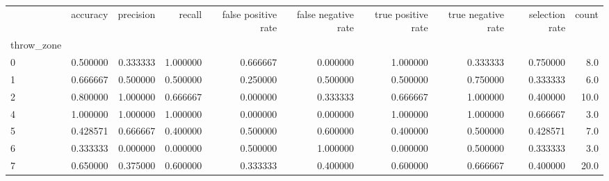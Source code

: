 \begin{tabular}{lrrrrrrrrr}
\toprule
{} &  accuracy &  precision &    recall &  false positive rate &  false negative rate &  true positive rate &  true negative rate &  selection rate &  count \\
throw\_zone &           &            &           &                      &                      &                     &                     &                 &        \\
\midrule
0          &  0.500000 &   0.333333 &  1.000000 &             0.666667 &             0.000000 &            1.000000 &            0.333333 &        0.750000 &    8.0 \\
1          &  0.666667 &   0.500000 &  0.500000 &             0.250000 &             0.500000 &            0.500000 &            0.750000 &        0.333333 &    6.0 \\
2          &  0.800000 &   1.000000 &  0.666667 &             0.000000 &             0.333333 &            0.666667 &            1.000000 &        0.400000 &   10.0 \\
4          &  1.000000 &   1.000000 &  1.000000 &             0.000000 &             0.000000 &            1.000000 &            1.000000 &        0.666667 &    3.0 \\
5          &  0.428571 &   0.666667 &  0.400000 &             0.500000 &             0.600000 &            0.400000 &            0.500000 &        0.428571 &    7.0 \\
6          &  0.333333 &   0.000000 &  0.000000 &             0.500000 &             1.000000 &            0.000000 &            0.500000 &        0.333333 &    3.0 \\
7          &  0.650000 &   0.375000 &  0.600000 &             0.333333 &             0.400000 &            0.600000 &            0.666667 &        0.400000 &   20.0 \\
\bottomrule
\end{tabular}
